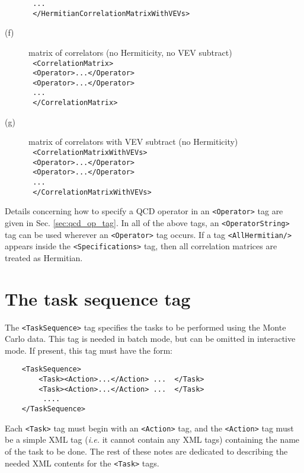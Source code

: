 \documentclass[12pt,notitlepage,letterpaper]{article}
\newcommand{\vb}{\texttt}
\begin{document}
\begin{description}
\hspace*{25pt}\texttt{                ...                 }\\            
\texttt{       </HermitianCorrelationMatrixWithVEVs> } 
\item[(f)]
 matrix of correlators (no Hermiticity, no VEV subtract)\\
\texttt{        <CorrelationMatrix>         }\\ 
\hspace*{15pt}\texttt{            <Operator>...</Operator> }\\
\hspace*{15pt}\texttt{            <Operator>...</Operator> }\\
\hspace*{25pt}\texttt{                 ...          }\\       
\texttt{        </CorrelationMatrix>  }      
\item[(g)]
 matrix of correlators with VEV subtract (no Hermiticity)\\
 \texttt{       <CorrelationMatrixWithVEVs>  }\\
\hspace*{15pt} \texttt{           <Operator>...</Operator> }\\
\hspace*{15pt} \texttt{           <Operator>...</Operator> }\\
\hspace*{25pt} \texttt{                ...                 }\\
 \texttt{       </CorrelationMatrixWithVEVs> }
\end{description}
Details concerning how to specify a QCD operator in an \vb{<Operator>}
tag are given in Sec. \ref{sec:qcd_op_tag}.  In all of the above tags, an
\vb{<OperatorString>} tag can be used wherever an \vb{<Operator>} tag occurs.
If a tag \vb{<AllHermitian/>} appears inside the \vb{<Specifications>}
tag, then all correlation matrices are treated as Hermitian.

\section{The task sequence tag}

The \vb{<TaskSequence>} tag specifies the tasks to be performed using the 
Monte Carlo data.  This tag is needed in batch mode, but 
can be omitted in interactive mode.  If present, this tag must have the form:
\begin{verbatim}
    <TaskSequence>
        <Task><Action>...</Action> ...  </Task>
        <Task><Action>...</Action> ...  </Task>
         .... 
    </TaskSequence>
\end{verbatim}
Each \vb{<Task>} tag must begin with an \vb{<Action>} tag, and
the \vb{<Action>} tag must be a simple XML tag (\textit{i.e.} it cannot contain
any XML tags) containing the name of the task to be done.
The rest of these notes are dedicated to describing the needed XML contents
for the \vb{<Task>} tags.
\end{document}
